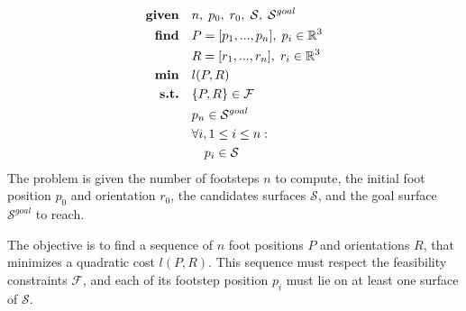 \begin{equation}
\label{eq:mip_simple}
\begin{aligned}
    \textrm{\textbf{given}} %
                            \quad & n, \; p_0, \; r_0, \; \mathcal{S}, \; \mathcal{S}^{goal} \nonumber\\
    \textrm{\textbf{find}}  \quad & P=[p_1,...,p_n], \; p_i \in \mathbb{R}^{3}\\
                            \quad & R=[r_1,...,r_n], \; r_i \in \mathbb{R}^{3}\\
    \textrm{\textbf{min}}  \quad & l(P,R)\\
    \textrm{\textbf{s.t.}}  \quad & \{P,R\} \in \mathcal{F}\\
                            \quad & p_n \in \mathcal{S}^{goal}\\
                            \quad & \forall i, 1 \leq i \leq n :\\
                                \quad & \quad p_i \in \mathcal{S}\\
\end{aligned}
\end{equation}
The problem is given the number of footsteps $n$ to compute, the initial foot position $p_0$ and orientation $r_0$, the candidates surfaces $\mathcal{S}$, and the goal surface $\mathcal{S}^{goal}$ to reach.

The objective is to find a sequence of $n$ foot positions $P$ and orientations $R$, that minimizes a quadratic cost $l(P,R)$.
This sequence must respect the feasibility constraints $\mathcal{F}$, and each of its footstep position $p_i$ must lie on at least one surface of $\mathcal{S}$.

